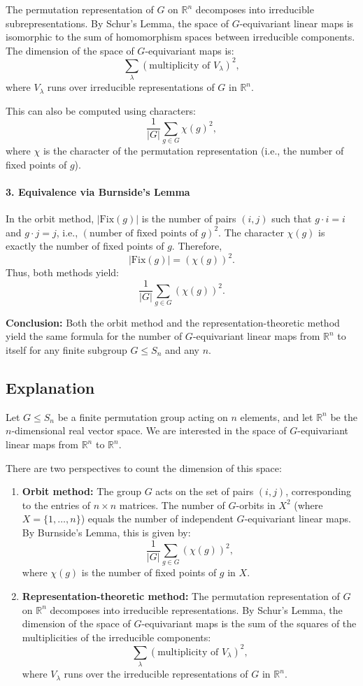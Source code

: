 \documentclass[11pt]{article}
\begin{document}
The permutation representation of $G$ on $\mathbb{R}^n$ decomposes into irreducible subrepresentations. By Schur's Lemma, the space of $G$-equivariant linear maps is isomorphic to the sum of homomorphism spaces between irreducible components. The dimension of the space of $G$-equivariant maps is:
\[
\sum_{\lambda} (\text{multiplicity of } V_\lambda)^2,
\]
where $V_\lambda$ runs over irreducible representations of $G$ in $\mathbb{R}^n$.

This can also be computed using characters:
\[
\frac{1}{|G|} \sum_{g \in G} \chi(g)^2,
\]
where $\chi$ is the character of the permutation representation (i.e., the number of fixed points of $g$).

\paragraph{3. Equivalence via Burnside's Lemma}

In the orbit method, $|\mathrm{Fix}(g)|$ is the number of pairs $(i,j)$ such that $g \cdot i = i$ and $g \cdot j = j$, i.e., $(\text{number of fixed points of } g)^2$. The character $\chi(g)$ is exactly the number of fixed points of $g$. Therefore,
\[
|\mathrm{Fix}(g)| = (\chi(g))^2.
\]
Thus, both methods yield:
\[
\frac{1}{|G|} \sum_{g \in G} (\chi(g))^2.
\]

\textbf{Conclusion:} Both the orbit method and the representation-theoretic method yield the same formula for the number of $G$-equivariant linear maps from $\mathbb{R}^n$ to itself for any finite subgroup $G \leq S_n$ and any $n$.

\subsection*{Explanation}
Let $G \leq S_n$ be a finite permutation group acting on $n$ elements, and let $\mathbb{R}^n$ be the $n$-dimensional real vector space. We are interested in the space of $G$-equivariant linear maps from $\mathbb{R}^n$ to $\mathbb{R}^n$.

There are two perspectives to count the dimension of this space:

\begin{enumerate}
    \item \textbf{Orbit method:} The group $G$ acts on the set of pairs $(i, j)$, corresponding to the entries of $n \times n$ matrices. The number of $G$-orbits in $X^2$ (where $X = \{1, \ldots, n\}$) equals the number of independent $G$-equivariant linear maps. By Burnside's Lemma, this is given by:
    \[
    \frac{1}{|G|} \sum_{g \in G} (\chi(g))^2,
    \]
    where $\chi(g)$ is the number of fixed points of $g$ in $X$.
    \item \textbf{Representation-theoretic method:} The permutation representation of $G$ on $\mathbb{R}^n$ decomposes into irreducible representations. By Schur's Lemma, the dimension of the space of $G$-equivariant maps is the sum of the squares of the multiplicities of the irreducible components:
    \[
    \sum_{\lambda} (\text{multiplicity of } V_\lambda)^2,
    \]
    where $V_\lambda$ runs over the irreducible representations of $G$ in $\mathbb{R}^n$.
\end{enumerate}
\end{document}
